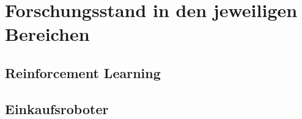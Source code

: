 \newpage
\section{Forschungsstand in den jeweiligen Bereichen}
\subsection{Reinforcement Learning}
\subsection{Einkaufsroboter}